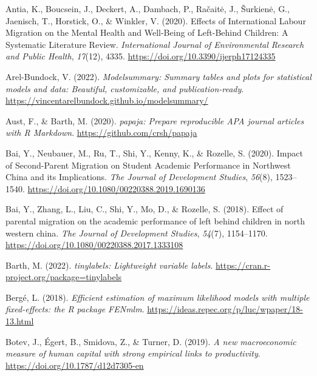 \documentclass[
  man]{apa7}
\newlength{\cslhangindent}
\newlength{\cslentryspacingunit} %
\newenvironment{CSLReferences}[2] %
 {%
  \setlength{\parindent}{0pt}
  \ifodd #1
  \let\oldpar\par
  \def\par{\hangindent=\cslhangindent\oldpar}
  \fi
  \setlength{\parskip}{#2\cslentryspacingunit}
 }%
 {}
\begin{document}
\hypertarget{refs}{}
\begin{CSLReferences}{1}{0}
\leavevmode{}%
Antia, K., Boucsein, J., Deckert, A., Dambach, P., Račaitė, J., Šurkienė, G., Jaenisch, T., Horstick, O., \& Winkler, V. (2020). Effects of International Labour Migration on the Mental Health and Well-Being of Left-Behind Children: A Systematic Literature Review. \emph{International Journal of Environmental Research and Public Health}, \emph{17}(12), 4335. \url{https://doi.org/10.3390/ijerph17124335}

\leavevmode{}%
Arel-Bundock, V. (2022). \emph{Modelsummary: Summary tables and plots for statistical models and data: Beautiful, customizable, and publication-ready}. \url{https://vincentarelbundock.github.io/modelsummary/}

\leavevmode{}%
Aust, F., \& Barth, M. (2020). \emph{{papaja}: {Prepare} reproducible {APA} journal articles with {R Markdown}}. \url{https://github.com/crsh/papaja}

\leavevmode{}%
Bai, Y., Neubauer, M., Ru, T., Shi, Y., Kenny, K., \& Rozelle, S. (2020). Impact of Second-Parent Migration on Student Academic Performance in Northwest China and its Implications. \emph{The Journal of Development Studies}, \emph{56}(8), 1523--1540. \url{https://doi.org/10.1080/00220388.2019.1690136}

\leavevmode{}%
Bai, Y., Zhang, L., Liu, C., Shi, Y., Mo, D., \& Rozelle, S. (2018). Effect of parental migration on the academic performance of left behind children in north western china. \emph{The Journal of Development Studies}, \emph{54}(7), 1154--1170. \url{https://doi.org/10.1080/00220388.2017.1333108}

\leavevmode{}%
Barth, M. (2022). \emph{{tinylabels}: Lightweight variable labels}. \url{https://cran.r-project.org/package=tinylabels}

\leavevmode{}%
Bergé, L. (2018). \emph{Efficient estimation of maximum likelihood models with multiple fixed-effects: the R package FENmlm}. \url{https://ideas.repec.org/p/luc/wpaper/18-13.html}

\leavevmode{}%
Botev, J., Égert, B., Smidova, Z., \& Turner, D. (2019). \emph{A new macroeconomic measure of human capital with strong empirical links to productivity}. \url{https://doi.org/10.1787/d12d7305-en}


\end{CSLReferences}
\end{document}

